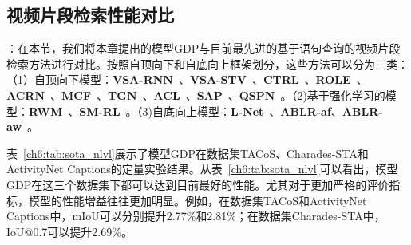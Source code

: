 \begin{table}[tbp]
    \centering
    \caption{不同基于视频查询的视频片段检索方法的性能对比}
    \label{ch6:tab:sota_vrl}
\end{table}


\subsection{视频片段检索性能对比}

\textbf{}：在本节，我们将本章提出的模型GDP与目前最先进的基于语句查询的视频片段检索方法进行对比。按照自顶向下和自底向上框架划分，这些方法可以分为三类：（1）自顶向下模型：\textbf{VSA-RNN}~\cite{gao2017tall}、\textbf{VSA-STV}~\cite{gao2017tall}、\textbf{CTRL}~\cite{gao2017tall}、\textbf{ROLE}~\cite{liu2018cross}、\textbf{ACRN}~\cite{liu2018attentive}、\textbf{MCF}~\cite{wu2018multi}、\textbf{TGN}~\cite{chen2018temporally}、\textbf{ACL}~\cite{ge2019mac}、\textbf{SAP}~\cite{chen2019semantic}、\textbf{QSPN}~\cite{xu2019multilevel}。（2)基于强化学习的模型：\textbf{RWM}~\cite{he2019read}、\textbf{SM-RL}~\cite{wang2019language}。（3)自底向上模型：\textbf{L-Net}~\cite{chen2019localizing}、\textbf{ABLR-af}、\textbf{ABLR-aw}~\cite{yuan2019find}。

表~\ref{ch6:tab:sota_nlvl}展示了模型GDP在数据集TACoS、Charades-STA和ActivityNet Captions的定量实验结果。从表~\ref{ch6:tab:sota_nlvl}可以看出，模型GDP在这三个数据集下都可以达到目前最好的性能。尤其对于更加严格的评价指标，模型的性能增益往往更加明显。例如，在数据集TACoS和ActivityNet Captions中，mIoU可以分别提升2.77\%和2.81\%；在数据集Charades-STA中，IoU@0.7可以提升2.69\%。


